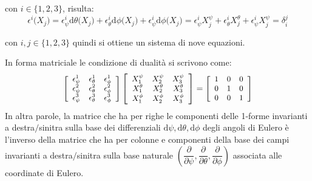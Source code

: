 \documentclass[11pt]{report}
\theoremstyle{plain}
\theoremstyle{definition}
\theoremstyle{remark}
\begin{document}
con $i \in \lbrace1,2,3 \rbrace$, risulta:
\begin{displaymath}
\epsilon^{i} \bigr( X_{j} \bigr) = \epsilon^{i} _{\psi} \textrm{d}\theta\bigr( X_{j} \bigr) +\epsilon^{i} _{\theta} \textrm{d}\phi\bigr( X_{j} \bigr) +\epsilon^{i} _{\psi} \textrm{d}\phi\bigr( X_{j} \bigr) = \epsilon^{i} _{\psi} X_{j}^{\psi} +\epsilon^{i} _{\theta} X_{j}^{\theta} +\epsilon^{i} _{\psi} X_{j}^{\psi} = \delta_{i}^{j}
\end{displaymath}

con $i,j \in \lbrace1,2,3 \rbrace$ quindi si ottiene un sistema di nove equazioni.

In forma matriciale le condizione di dualità si scrivono come:
\begin{equation}\label{eq:sistemamatriciduali}\small
\left[ \begin{array}{ccc}
\epsilon_{\psi}^{1} & \epsilon_{\theta}^{1} & \epsilon_{\phi}^{1}  \\
\epsilon_{\psi}^{2} & \epsilon_{\theta}^{2} & \epsilon_{\phi}^{2} \\
\epsilon_{\psi}^{3} & \epsilon_{\theta}^{3} & \epsilon_{\phi}^{3} \\
\end{array} \right] \left[ \begin{array}{ccc}
X_{1}^{\psi} & X_{2}^{\psi} & X_{3}^{\psi}  \\
X_{1}^{\theta} & X_{2}^{\theta} & X_{3}^{\theta} \\
X_{1}^{\phi} & X_{2}^{\phi} & X_{3}^{\phi} \\
\end{array} \right] = \left[ \begin{array}{ccc}
1 & 0 & 0  \\
0 & 1 & 0 \\
0 & 0 & 1 \\
\end{array} \right]
\end{equation}
In altra parole, la matrice che ha per righe le componenti delle 1-forme invarianti a destra$/$sinitra sulla base dei differenziali $\textrm{d}\psi, \textrm{d}\theta ,\textrm{d}\phi $ degli angoli di Eulero è l'inverso della matrice che ha per colonne e componenti della base dei campi invarianti a destra$/$sinitra sulla base naturale $(\dfrac{\partial}{\partial \psi},\dfrac{\partial}{\partial \theta},\dfrac{\partial}{\partial \phi})$ associata alle coordinate di Eulero.
\end{document}
